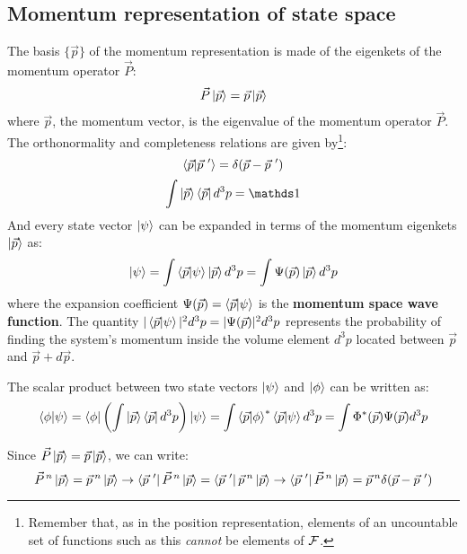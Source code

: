 \subsection{Momentum representation of state space}

The basis $\{\vec{p}\}$ of the momentum representation is made of the eigenkets of the momentum operator $\vec{P}$:
\begin{equation}
    \vec{P}\ket{\vec{p}} = \vec{p}\ket{\vec{p}}
\end{equation}
where $\vec{p}$, the momentum vector, is the eigenvalue of the momentum operator $\vec{P}$. The orthonormality and completeness relations are given by\footnote{Remember that, as in the position representation, elements of an uncountable set of functions such as this \textit{cannot} be elements of $\mathcal{F}$.}:
\begin{equation}
    \braket{\vec{p}|\vec{p}\ '} = \delta(\vec{p} - \vec{p}\ ')
\end{equation}
\begin{equation}
    \int \ket{\vec{p}}\bra{\vec{p}} d^3p = \Imat
\end{equation}
And every state vector $\ket{\psi}$ can be expanded in terms of the momentum eigenkets $\ket{\vec{p}}$ as:
\begin{equation}
    \ket{\psi} = \int \braket{\vec{p}|\psi} \ket{\vec{p}} d^3 p = \int \Psi(\vec{p}) \ket{\vec{p}} d^3 p
\end{equation}
where the expansion coefficient $\Psi(\vec{p}) = \braket{\vec{p}|\psi}$ is the \textbf{momentum space wave function}. The quantity $|\braket{\vec{p}|\psi}|^2d^3 p = |\Psi(\vec{p})|^2d^3p$ represents the probability of finding the system's momentum inside the volume element $d^3p$ located between $\vec{p}$ and $\vec{p} + d\vec{p}$.

The scalar product between two state vectors $\ket{\psi}$ and $\ket{\phi}$ can be written as:
\begin{equation}
    \braket{\phi|\psi} = \bra{\phi}\left(\int \ket{\vec{p}}\bra{\vec{p}}d^3p\right)\ket{\psi} = \int \braket{\vec{p}|\phi}^*\braket{\vec{p}|\psi} d^3p = \int \Phi^*(\vec{p})\Psi(\vec{p}) d^3p
\end{equation}

Since $\vec{P}\ket{\vec{p}} = \vec{p}\ket{\vec{p}}$, we can write:
\begin{equation}
    \vec{P}^{\, n}\ket{\vec{p}} = \vec{p}\, ^n\ket{\vec{p}} \to \bra{\vec{p}\ '}\vec{P}^{\, n}\ket{\vec{p}} = \bra{\vec{p}\ '}\vec{p}\, ^n\ket{\vec{p}} \to \bra{\vec{p}\ '}\vec{P}^{\, n}\ket{\vec{p}} = \vec{p}\, ^n\delta(\vec{p} - \vec{p}\ ')
\end{equation}

